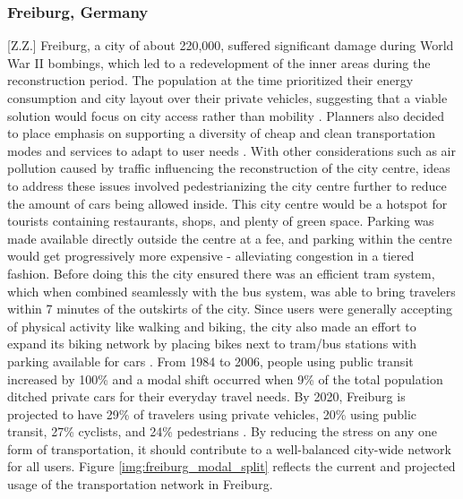 \documentclass[12pt]{article}                       %
\begin{document}
\subsubsection{Freiburg, Germany}[Z.Z.]
Freiburg, a city of about 220,000, suffered significant damage during World War II bombings, which led to a redevelopment of the inner areas during the reconstruction period. The population at the time prioritized their energy consumption and city layout over their private vehicles, suggesting that a viable solution would focus on city access rather than mobility \cite{Rydningen2017OsloCentre}. Planners also decided to place emphasis on supporting a diversity of cheap and clean transportation modes and services to adapt to user needs \cite{Bindra2006SmartGermany}. With other considerations such as air pollution caused by traffic influencing the reconstruction of the city centre, ideas to address these issues involved pedestrianizing the city centre further to reduce the amount of cars being allowed inside. This city centre would be a hotspot for tourists containing restaurants, shops, and plenty of green space. Parking was made available directly outside the centre at a fee, and parking within the centre would get progressively more expensive - alleviating congestion in a tiered fashion\cite{Bindra2006SmartGermany}. Before doing this the city ensured there was an efficient tram system, which when combined seamlessly with the bus system, was able to bring travelers within 7 minutes of the outskirts of the city. Since users were generally accepting of physical activity like walking and biking, the city also made an effort to expand its biking network by placing bikes next to tram/bus stations with parking available for cars \cite{Bindra2006SmartGermany}. From 1984 to 2006, people using public transit increased by 100\% and a modal shift occurred when 9\% of the total population ditched private cars for their everyday travel needs.  By 2020, Freiburg is projected to have 29\% of travelers using private vehicles, 20\% using public transit, 27\% cyclists, and 24\% pedestrians \cite{Rydningen2017OsloCentre}. By reducing the stress on any one form of transportation, it should contribute to a well-balanced city-wide network for 
all users. Figure \ref{img:freiburg_modal_split} reflects the current and projected usage of the transportation network in Freiburg.
\end{document}

